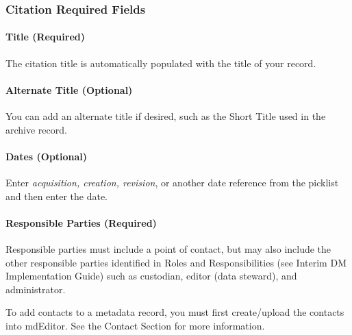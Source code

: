 \documentclass[
]{book}
\makeatletter
\let\oldparagraph\paragraph
\renewcommand{\paragraph}[1]{\oldparagraph{#1}\mbox{}}
\newenvironment{kframe}{%
\medskip{}
\setlength{\fboxsep}{.8em}
 \def\at@end@of@kframe{}%
 \ifinner\ifhmode%
  \def\at@end@of@kframe{\end{minipage}}%
  \begin{minipage}{\columnwidth}%
 \fi\fi%
 \def\FrameCommand##1{\hskip\@totalleftmargin \hskip-\fboxsep
 \colorbox{shadecolor}{##1}\hskip-\fboxsep
     \hskip-\linewidth \hskip-\@totalleftmargin \hskip\columnwidth}%
 \MakeFramed {\advance\hsize-\width
   \@totalleftmargin\z@ \linewidth\hsize
   \@setminipage}}%
 {\par\unskip\endMakeFramed%
 \at@end@of@kframe}
\newenvironment{rmdblock}[1]
  {
  \begin{itemize}
  \renewcommand{\labelitemi}{
    \raisebox{-.7\height}[0pt][0pt]{
      {\setkeys{Gin}{width=3em,keepaspectratio}\texttt{[image: images/\#1]}}
    }
  }
  \setlength{\fboxsep}{1em}
  \begin{kframe}
  \item
  }
  {
  \end{kframe}
  \end{itemize}
  }
\newenvironment{rmdtip}
  {\begin{rmdblock}{tip}}
  {\end{rmdblock}}
\makeatother
\begin{document}
\hypertarget{citation-required-fields-1}{%
\subsubsection*{Citation Required Fields}\label{citation-required-fields-1}}

\hypertarget{title-required-2}{%
\paragraph{Title (Required)}\label{title-required-2}}

The citation title is automatically populated with the title of your record.

\hypertarget{alternate-title-optional}{%
\paragraph{Alternate Title (Optional)}\label{alternate-title-optional}}

You can add an alternate title if desired, such as the Short Title used in the archive record.

\hypertarget{dates-optional}{%
\paragraph{Dates (Optional)}\label{dates-optional}}

Enter \emph{acquisition, creation, revision}, or another date reference from the picklist and then enter the date.

\hypertarget{responsible-parties-required-1}{%
\paragraph{Responsible Parties (Required)}\label{responsible-parties-required-1}}

Responsible parties must include a point of contact, but may also include the other responsible parties identified in Roles and Responsibilities (see Interim DM Implementation Guide) such as custodian, editor (data steward), and administrator.

\begin{rmdtip}
To add contacts to a metadata record, you must first create/upload the
contacts into mdEditor. See the Contact Section for more information.
\end{rmdtip}
\end{document}
